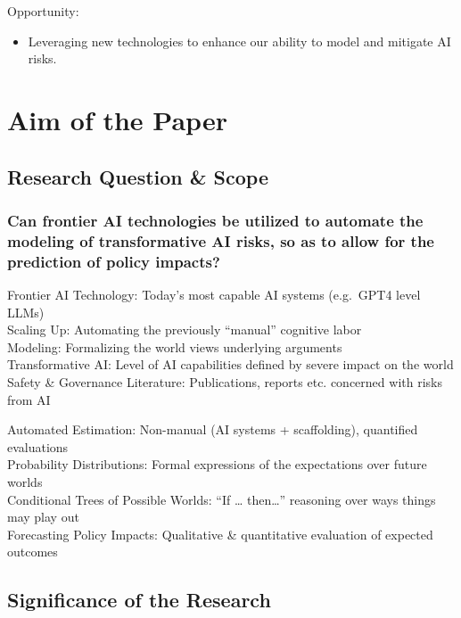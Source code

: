 \documentclass[
  letterpaper,
]{book}
\providecommand{\tightlist}{%
  \setlength{\itemsep}{0pt}\setlength{\parskip}{0pt}}
\begin{document}
Opportunity:

\begin{itemize}
\tightlist
\item
  Leveraging new technologies to enhance our ability to model and
  mitigate AI risks.
\end{itemize}

\section{Aim of the Paper}\label{aim-of-the-paper}

\subsection{Research Question \& Scope}\label{research-question-scope}

\subsubsection{Can frontier AI technologies be utilized to automate the
modeling of transformative AI risks, so as to allow for the prediction
of policy
impacts?}\label{can-frontier-ai-technologies-be-utilized-to-automate-the-modeling-of-transformative-ai-risks-so-as-to-allow-for-the-prediction-of-policy-impacts}

Frontier AI Technology: Today's most capable AI systems (e.g.~GPT4 level
LLMs)\\
Scaling Up: Automating the previously ``manual'' cognitive labor\\
Modeling: Formalizing the world views underlying arguments\\
Transformative AI: Level of AI capabilities defined by severe impact on
the world\\
Safety \& Governance Literature: Publications, reports etc. concerned
with risks from AI

Automated Estimation: Non-manual (AI systems + scaffolding), quantified
evaluations\\
Probability Distributions: Formal expressions of the expectations over
future worlds\\
Conditional Trees of Possible Worlds: ``If \ldots{} then\ldots{}''
reasoning over ways things may play out\\
Forecasting Policy Impacts: Qualitative \& quantitative evaluation of
expected outcomes

\subsection{Significance of the
Research}\label{significance-of-the-research}
\end{document}

